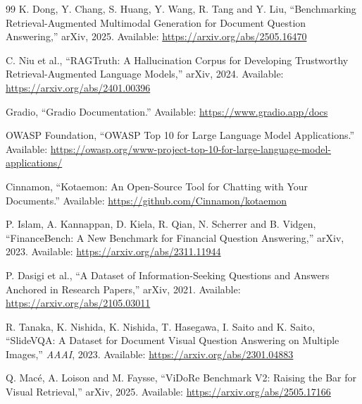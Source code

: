 \documentclass[a4paper,11pt]{article}
\begin{document}
\begin{thebibliography}{99}
K. Dong, Y. Chang, S. Huang, Y. Wang, R. Tang and Y. Liu, ``Benchmarking Retrieval-Augmented Multimodal Generation for Document Question Answering,'' arXiv, 2025. Available: \url{https://arxiv.org/abs/2505.16470}

C. Niu et al., ``RAGTruth: A Hallucination Corpus for Developing Trustworthy Retrieval-Augmented Language Models,'' arXiv, 2024. Available: \url{https://arxiv.org/abs/2401.00396}

Gradio, ``Gradio Documentation.'' Available: \url{https://www.gradio.app/docs}

OWASP Foundation, ``OWASP Top 10 for Large Language Model Applications.'' Available: \url{https://owasp.org/www-project-top-10-for-large-language-model-applications/}

Cinnamon, ``Kotaemon: An Open-Source Tool for Chatting with Your Documents.'' Available: \url{https://github.com/Cinnamon/kotaemon}

P. Islam, A. Kannappan, D. Kiela, R. Qian, N. Scherrer and B. Vidgen, ``FinanceBench: A New Benchmark for Financial Question Answering,'' arXiv, 2023. Available: \url{https://arxiv.org/abs/2311.11944}

P. Dasigi et al., ``A Dataset of Information-Seeking Questions and Answers Anchored in Research Papers,'' arXiv, 2021. Available: \url{https://arxiv.org/abs/2105.03011}

R. Tanaka, K. Nishida, K. Nishida, T. Hasegawa, I. Saito and K. Saito, ``SlideVQA: A Dataset for Document Visual Question Answering on Multiple Images,'' \textit{AAAI}, 2023. Available: \url{https://arxiv.org/abs/2301.04883}

Q. Macé, A. Loison and M. Faysse, ``ViDoRe Benchmark V2: Raising the Bar for Visual Retrieval,'' arXiv, 2025. Available: \url{https://arxiv.org/abs/2505.17166}

\end{thebibliography}
\end{document}
